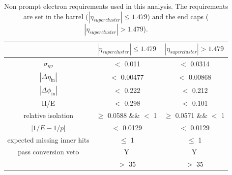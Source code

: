 \begin{table}[htbp]
	\centering
	
	\caption{Non prompt electron requirements used in this analysis. The requirements are set in the barrel ($|\eta_{supercluster}| \leq 1.479$)
		and the end caps ($|\eta_{supercluster}| > 1.479$). }
	\begin{tabular}{ccc}
		\toprule
		& \multicolumn{1}{c|}{$|\eta_{supercluster}| \leq 1.479$ } & \multicolumn{1}{c}{$|\eta_{supercluster}| > 1.479$ } \\
		\midrule
		$\sigma_{\eta \eta}$ & $<$ 0.011 & $<$ 0.0314 \\ 
		
		$|\Delta\eta_{\mathrm{in}}|$ & $<$ 0.00477& $<$ 0.00868\\ 
		
		$|\Delta\phi_{\mathrm{in}}|$ & $<$ 0.222 &  $<$ 0.212 \\ 
		 
		H/E & $<$ 0.298& $<$ 0.101 \\ 
		
		relative isolation & $\geq$ 0.0588 \&\& $<$ 1 &  $\geq$ 0.0571 \&\& $<$ 1\\ 
	
		$|1/E-1/p|$ & $<$ 0.0129 \GeVinv & $<$ 0.0129 \GeVinv \\ 
		
		expected missing inner hits & $\leq $ 1 &  $\leq $ 1\\ 
	
		pass conversion veto & Y & Y \\ 
	
		\pt &$>$ 35 \GeV & $>$ 35 \GeV \\
		\bottomrule
	\end{tabular} 
	\label{tab:nonpromptel}
\end{table}

